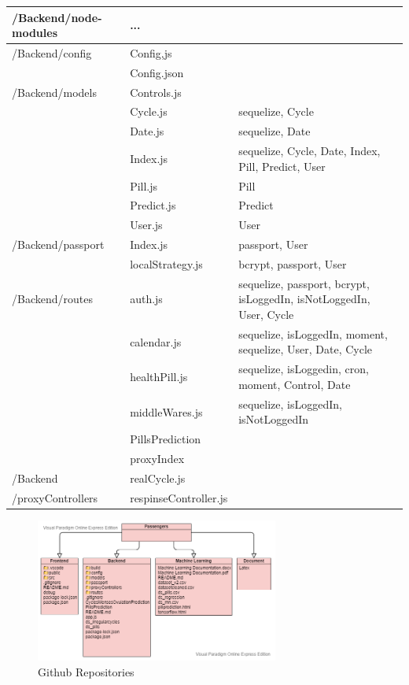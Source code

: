 \documentclass[conference]{IEEEtran}
\begin{document}
\begin{enumerate}
\begin{table}[ht!]
\begin{threeparttable}
\begin{tabular}{p{2cm}p{2.5cm}p{2.7cm}}
            /Backend/node-modules & ...\\
            \hline
            /Backend/config & Config,js \\ 
            & Config.json \\
            \hline
            /Backend/models & Controls.js \\ 
            & Cycle.js & sequelize, Cycle\\
            & Date.js & sequelize, Date \\
            & Index.js & sequelize, Cycle, Date, Index, Pill, Predict, User \\
            & Pill.js & Pill\\
            & Predict.js & Predict\\
            & User.js & User \\
            \hline
            /Backend/passport & Index.js  & passport, User \\
            & localStrategy.js & bcrypt, passport, User \\
            \hline
            /Backend/routes & auth.js &  sequelize, passport, bcrypt, isLoggedIn, isNotLoggedIn, User, Cycle\\ 
            & calendar.js & sequelize, isLoggedIn, moment, sequelize, User, Date, Cycle\\ 
            & healthPill.js &  sequelize, isLoggedin, cron, moment, Control, Date \\
            & middleWares.js & sequelize, isLoggedIn, isNotLoggedIn
            \\
            & PillsPrediction & \\
            & proxyIndex & \\
            \hline
            /Backend & realCycle.js \\
            /proxyControllers& respinseController.js \\
            \bottomrule
            \end{tabular}
        \end{threeparttable}
    \end{table}   
\begin{figure}[ht]
\includegraphics[width=8cm, center]{github repo.png}
\caption{Github Repositories}
\label{fig45}
\end{figure}    
    
\end{enumerate}
\end{document}
